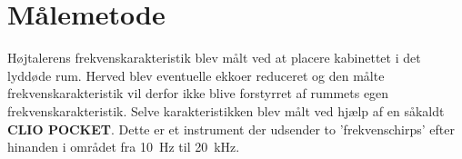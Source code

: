 \section{Målemetode}
Højtalerens frekvenskarakteristik blev målt ved at placere kabinettet i det lyddøde rum. Herved blev eventuelle ekkoer reduceret og den målte frekvenskarakteristik vil derfor ikke blive forstyrret af rummets egen frekvenskarakteristik. Selve karakteristikken blev målt ved hjælp af en såkaldt \textbf{CLIO POCKET}. Dette er et instrument der udsender to 'frekvenschirps' efter hinanden i området fra \SI{10}{\hertz} til \SI{20}{\kilo\hertz}.